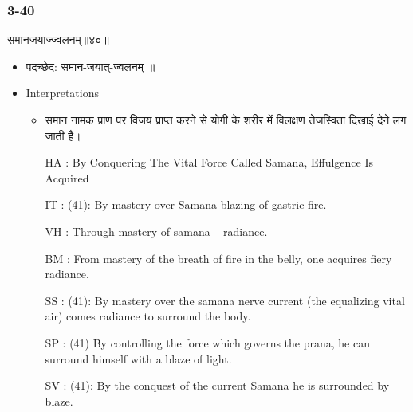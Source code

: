 \begin{frame}[fragile]\frametitle{3-40}
\begin{sanskrit}
समानजयाज्ज्वलनम्॥४०॥
\end{sanskrit}

	\begin{itemize}
	\item पदच्छेद:  समान-जयात्-ज्वलनम् ॥
	\item Interpretations
		\begin{itemize}	
		\item समान नामक प्राण पर विजय प्राप्त करने से योगी के शरीर में विलक्षण तेजस्विता दिखाई देने लग जाती है।
		\item [HA]: By Conquering The Vital Force Called Samana, Effulgence Is Acquired
		\item [IT]: (41): By mastery over Samana blazing of gastric fire.
		\item [VH]: Through mastery of samana – radiance.
		\item [BM]: From mastery of the breath of fire in the belly, one acquires fiery radiance.
		\item [SS]: (41): By mastery over the samana nerve current (the equalizing vital air) comes radiance to surround the body.
		\item [SP]: (41) By controlling the force which governs the prana, he can surround himself with a blaze of light.
		\item [SV]: (41): By the conquest of the current Samana he is surrounded by blaze. 
		\end{itemize}
	\end{itemize}
\end{frame}

